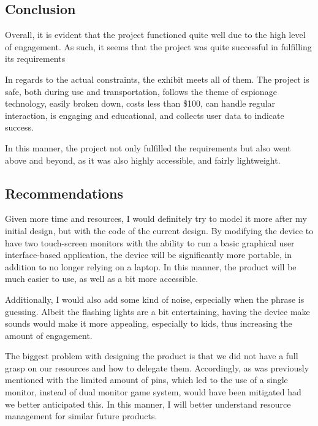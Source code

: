 \documentclass[conference]{IEEEtran}
\begin{document}
\subsection{Conclusion}

\par Overall, it is evident that the project functioned quite well due to the high level of engagement. As such, it seems that the project was quite successful in fulfilling its requirements
\par In regards to the actual constraints, the exhibit meets all of them. The project is safe, both during use and transportation, follows the theme of espionage technology, easily broken down, costs less than \$100, can handle regular interaction, is engaging and educational, and collects user data to indicate success.
\par In this manner, the project not only fulfilled the requirements but also went above and beyond, as it was also highly accessible, and fairly lightweight.

\subsection{Recommendations}

\par Given more time and resources, I would definitely try to model it more after my initial design, but with the code of the current design. By modifying the device to have two touch-screen monitors with the ability to run a basic graphical user interface-based application, the device will be significantly more portable, in addition to no longer relying on a laptop. In this manner, the product will be much easier to use, as well as a bit more accessible.
\par Additionally, I would also add some kind of noise, especially when the phrase is guessing. Albeit the flashing lights are a bit entertaining, having the device make sounds would make it more appealing, especially to kids, thus increasing the amount of engagement.
\par The biggest problem with designing the product is that we did not have a full grasp on our resources and how to delegate them. Accordingly, as was previously mentioned with the limited amount of pins, which led to the use of a single monitor, instead of dual monitor game system, would have been mitigated had we better anticipated this. In this manner, I will better understand resource management for similar future products.
\end{document}
